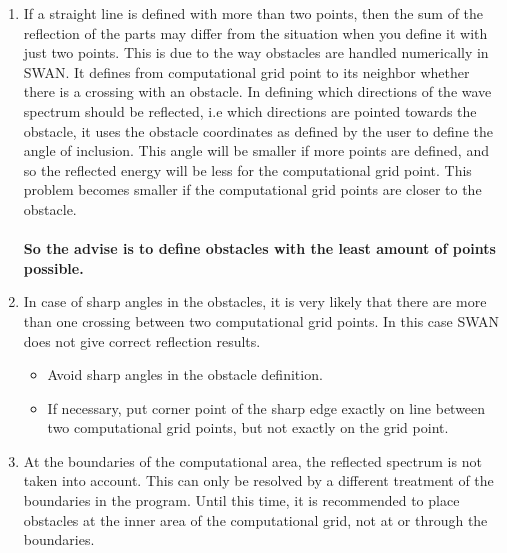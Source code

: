 \documentclass[12pt]{book}
\begin{document}
\begin{enumerate}
\item If a straight line is defined with more than two points, then the sum of the reflection of the parts
      may differ from the situation when you define it with just two points. This is due to the way
      obstacles are handled numerically in SWAN. It defines from computational grid point to its
      neighbor whether there is a crossing with an obstacle. In defining which directions of the wave
      spectrum should be reflected, i.e which directions are pointed towards the obstacle,  it uses the
      obstacle coordinates as defined by the user to define the angle of inclusion. This angle will be
      smaller if more points are defined, and so the reflected energy will be less for the computational
      grid point. This problem becomes smaller if the computational grid points are closer to the
      obstacle.\\
      \\
      {\bf So the advise is to define obstacles with the least amount of points possible.}
\item In case of sharp angles in the obstacles, it is very likely that there are more than one crossing
      between two computational grid points. In this case SWAN does not give correct reflection
      results.
      \begin{itemize}
         \item Avoid sharp angles in the obstacle definition.
         \item If necessary, put corner point of the sharp edge exactly on line between two computational grid points,
               but not exactly on the grid point.
      \end{itemize}
\item At the boundaries of the computational area, the reflected spectrum is not taken into account.
      This can only be resolved by a different treatment of the boundaries in the program. Until this
      time, it is recommended to place obstacles at the inner area of the computational grid, not at or
      through the boundaries.
\end{enumerate}
\end{document}
